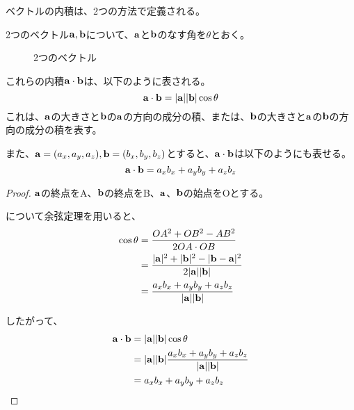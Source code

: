 \documentclass{ltjsreport}
\begin{document}
ベクトルの内積は、2つの方法で定義される。

2つのベクトル$\vb{a}, \vb{b}$について、$\vb{a}$と$\vb{b}$のなす角を$\theta$とおく。
\begin{figure}[H]
    \centering
    \caption{2つのベクトル}
    \label{2つのベクトル}
\end{figure}

これらの内積$\vb{a}\cdot\vb{b}$は、以下のように表される。
\begin{equation}
    \vb{a}\cdot\vb{b} = |\vb{a}||\vb{b}|\cos\theta
\end{equation}
これは、$\vb{a}$の大きさと$\vb{b}$の$\vb{a}$の方向の成分の積、または、$\vb{b}$の大きさと$\vb{a}$の$\vb{b}$の方向の成分の積を表す。

また、$\vb{a}=(a_x,a_y,a_z),\vb{b}=(b_x,b_y,b_z)$とすると、$\vb{a}\cdot\vb{b}$は以下のようにも表せる。
\begin{equation}
    \vb{a}\cdot\vb{b} = a_xb_x+a_yb_y+a_zb_z
\end{equation}

\begin{proof}
    $\vb{a}$の終点をA、$\vb{b}$の終点をB、$\vb{a}$、$\vb{b}$の始点をOとする。

    について余弦定理を用いると、
    \begin{align}
        \cos\theta &= \frac{OA^2+OB^2-AB^2}{2OA \cdot OB} \\
                   &= \frac{|\vb{a}|^2+|\vb{b}|^2-|\vb{b}-\vb{a}|^2}{2|\vb{a}||\vb{b}|} \\
                   &= \frac{a_xb_x+a_yb_y+a_zb_z}{|\vb{a}||\vb{b}|}
    \end{align}

    したがって、
    \begin{align}
        \vb{a}\cdot\vb{b} &= |\vb{a}||\vb{b}|\cos\theta \\
                     &= |\vb{a}||\vb{b}|\frac{a_xb_x+a_yb_y+a_zb_z}{|\vb{a}||\vb{b}|} \\
                     &= a_xb_x+a_yb_y+a_zb_z
    \end{align}
\end{proof}
\end{document}
